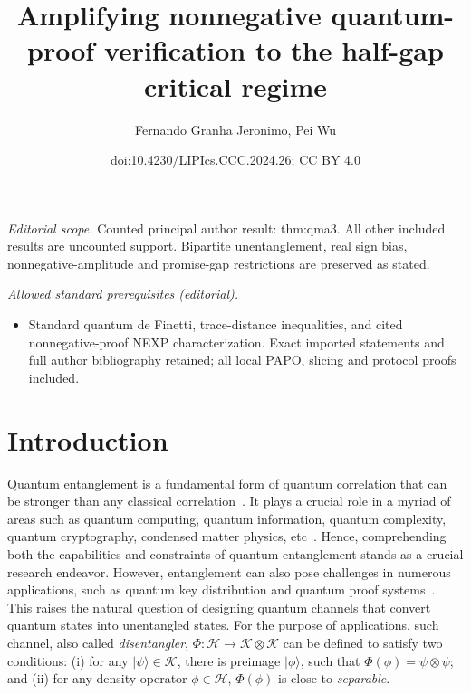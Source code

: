 \documentclass[10pt,a4paper]{article}
\title{Amplifying nonnegative quantum-proof verification to the half-gap critical regime}
\author{Fernando Granha Jeronimo, Pei Wu}
\date{doi:10.4230/LIPIcs.CCC.2024.26; CC BY 4.0}
\theoremstyle{remark}
\def\to{\rightarrow}
\newcommand{\cH}{\mathcal{H}}
\newcommand{\1}[1]{\mathds{1}{[#1]}}
\newcommand{\ket}[1]{\lvert #1\rangle}
\newcommand{\cK}{\mathcal{K}}
\numberwithin{equation}{section}
\begin{document}
\maketitle
\noindent\textit{Editorial scope.} Counted principal author result: thm:qma3. All other included results are uncounted support. Bipartite unentanglement, real sign bias, nonnegative-amplitude and promise-gap restrictions are preserved as stated.\par\medskip
\noindent\textit{Allowed standard prerequisites (editorial).}\begin{itemize}
\item Standard quantum de Finetti, trace-distance inequalities, and cited nonnegative-proof NEXP characterization. Exact imported statements and full author bibliography retained; all local PAPO, slicing and protocol proofs included.
\end{itemize}\medskip
\section{Introduction}

Quantum entanglement is a fundamental form of quantum correlation that
can be stronger than any classical correlation~\cite{EPR35, B64,CHSH69,JNVWY20}.
%
It plays a crucial role in a myriad of areas such as quantum computing, quantum information,
quantum complexity, quantum cryptography, condensed matter physics, etc~\cite{HHHH09,NC10,Watrous18}.
%
Hence, comprehending both the capabilities and constraints of quantum entanglement stands
as a crucial research endeavor.
%
However, entanglement can also pose challenges in numerous applications, such as quantum
key distribution and quantum proof systems~\cite{Renner08,KMY03,OW16,HHJWY17}.
%
This raises the natural question of designing quantum channels that convert quantum states
into unentangled states. 
%
For the purpose of applications, such channel, also called \emph{disentangler}, $\Phi: \cH \to \cK\otimes\cK$ can be defined to satisfy two
conditions: (i) for any $\ket\psi\in\cK$, there is preimage $\ket\phi$, such that $\Phi(\phi)=\psi\otimes\psi$;
and (ii) for any density operator $\phi\in \cH$, $\Phi(\phi)$ is close to \emph{separable}. 
\end{document}
